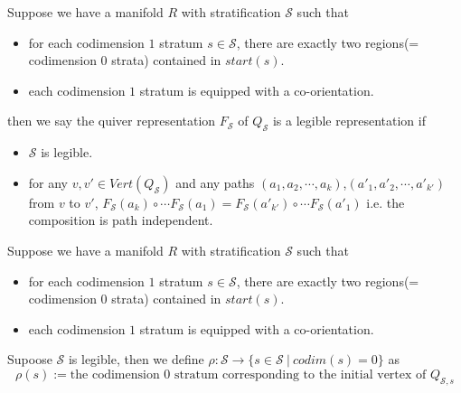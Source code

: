 \begin{definition}
Suppose we have a manifold $R$ with stratification $\mathcal{S}$ such that
\begin{itemize}
\item for each codimension $1$ stratum $s\in \mathcal{S}$, there are exactly two regions(= codimension $0$ strata) contained in $start(s)$.

\item each codimension $1$ stratum is equipped with a co-orientation.
\end{itemize}
then we say the quiver representation $F_{\mathcal{S}}$ of $Q_{\mathcal{S}}$ is a legible representation if
\begin{itemize}
\item $\mathcal{S}$ is legible.

\item for any $v,v' \in Vert(Q_{\mathcal{S}})$ and any paths $(a_1,a_2,\cdots,a_k)$,$(a'_1,a'_2,\cdots,a'_{k'})$ from $v$ to $v'$, $F_{\mathcal{S}}(a_k)\circ \cdots F_{\mathcal{S}}(a_1) = F_{\mathcal{S}}(a'_{k'})\circ \cdots F_{\mathcal{S}}(a'_1) $ i.e. the composition is path independent.
\end{itemize}
\end{definition}

\begin{definition}
Suppose we have a manifold $R$ with stratification $\mathcal{S}$ such that
\begin{itemize}
\item for each codimension $1$ stratum $s\in \mathcal{S}$, there are exactly two regions(= codimension $0$ strata) contained in $start(s)$.

\item each codimension $1$ stratum is equipped with a co-orientation.
\end{itemize}
Supoose $\mathcal{S}$ is legible, then we define $\rho:\mathcal{S}\rightarrow \{s\in \mathcal{S} ~|~ codim(s)=0 \}$ as
\[
\rho(s):=\text{the codimension $0$ stratum corresponding to the initial vertex of $Q_{\mathcal{S},s}$}
\]
\end{definition}

